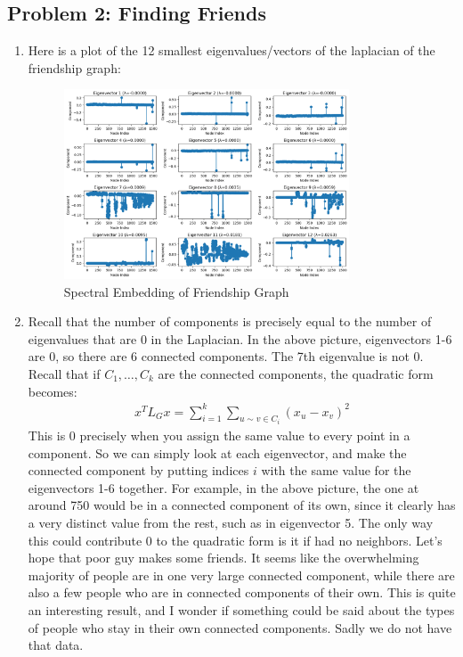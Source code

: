 \documentclass[12pt]{article}
\begin{document}
    \subsection*{Problem 2: Finding Friends}
    \begin{enumerate}[leftmargin=\labelsep, label=(\alph*)]
        \item Here is a plot of the 12 smallest eigenvalues/vectors of the laplacian of the friendship graph:
        \begin{figure}[H]
            \centering
            \includegraphics[width=0.8\textwidth]{12_eig.png}
            \caption{Spectral Embedding of Friendship Graph}
        \end{figure}
        \item Recall that the number of components is precisely equal to the number of eigenvalues that are 0 in the Laplacian. In the above picture, eigenvectors 1-6 are 0, so there are 6 connected components. The 7th eigenvalue is not 0. Recall that if $C_1, \ldots, C_k$ are the connected components, the quadratic form becomes:
        \begin{align*}
            x^T L_G x = \sum_{i=1}^k \sum_{u \sim v \in C_i} (x_u-x_v)^2
        \end{align*}
        This is 0 precisely when you assign the same value to every point in a component. So we can simply look at each eigenvector, and make the connected component by putting indices $i$ with the same value for the eigenvectors 1-6 together. For example, in the above picture, the one at around 750 would be in a connected component of its own, since it clearly has a very distinct value from the rest, such as in eigenvector 5. The only way this could contribute 0 to the quadratic form is it if had no neighbors. Let's hope that poor guy makes some friends. It seems like the overwhelming majority of people are in one very large connected component, while there are also a few people who are in connected components of their own. This is quite an interesting result, and I wonder if something could be said about the types of people who stay in their own connected components. Sadly we do not have that data.


\end{enumerate}
\end{document}
